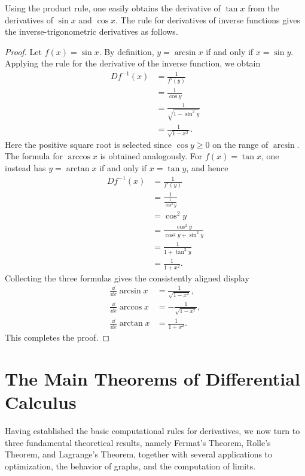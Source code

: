 Using the product rule, one easily obtains the derivative of $\tan x$
from the derivatives of $\sin x$ and $\cos x$. The rule for derivatives
of inverse functions gives the inverse-trigonometric derivatives as
follows.

\begin{proof}
Let $f(x) = \sin x$. By definition, $y = \arcsin x$ if and only if $x = \sin y$. Applying the rule for the derivative of the inverse function, we obtain
\[
\begin{aligned}
D f^{-1}(x) &= \frac{1}{f'(y)} \\
&= \frac{1}{\cos y} \\
&= \frac{1}{\sqrt{1 - \sin^2 y}} \\
&= \frac{1}{\sqrt{1 - x^2}}.
\end{aligned}
\]
Here the positive square root is selected since $\cos y \geq 0$ on the range of $\arcsin$. The formula for $\arccos x$ is obtained analogously. For $f(x) = \tan x$, one instead has $y = \arctan x$ if and only if $x = \tan y$, and hence
\[
\begin{aligned}
D f^{-1}(x) &= \frac{1}{f'(y)} \\
&= \frac{1}{\frac{1}{\cos^2 y}} \\
&= \cos^2 y \\
&= \frac{\cos^2 y}{\cos^2 y + \sin^2 y} \\
&= \frac{1}{1 + \tan^2 y} \\
&= \frac{1}{1 + x^2}.
\end{aligned}
\]
Collecting the three formulas gives the consistently aligned display
\[
\begin{aligned}
\frac{\dd}{\dd x}\arcsin x&=\frac{1}{\sqrt{1-x^2}},\\
\frac{\dd}{\dd x}\arccos x&=-\frac{1}{\sqrt{1-x^2}},\\
\frac{\dd}{\dd x}\arctan x&=\frac{1}{1+x^2}.
\end{aligned}
\]
This completes the proof.
\end{proof}

\section{The Main Theorems of Differential Calculus}

Having established the basic computational rules for derivatives, we now turn to three fundamental theoretical results, namely Fermat's Theorem, Rolle's Theorem, and Lagrange's Theorem, together with several applications to optimization, the behavior of graphs, and the computation of limits.

